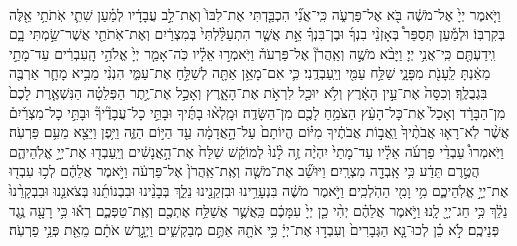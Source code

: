 \documentclass[twoside, openany, parskip=half, 11pt]{book}
\begin{document}
\begin{footnotesize}
\begin{multicols}{2}
\\
 וַיֹּ֤אמֶר יְיָ֙ אֶל־מֹשֶׁ֔ה בֹּ֖א אֶל־פַּרְעֹ֑ה כִּֽי־אֲנִ֞י הִכְבַּ֤דְתִּי אֶת־לִבּוֹ֙ וְאֶת־לֵ֣ב עֲבָדָ֔יו לְמַ֗עַן שִׁתִ֛י אֹֽתֹתַ֥י אֵ֖לֶּה בְּקִרְבּֽוֹ׃ וּלְמַ֡עַן תְּסַפֵּר֩ בְּאָזְנֵ֨י בִנְךָ֜ וּבֶן־בִּנְךָ֗ אֵ֣ת אֲשֶׁ֤ר הִתְעַלַּ֨לְתִּי֙ בְּמִצְרַ֔יִם וְאֶת־אֹֽתֹתַ֖י אֲשֶׁר־שַׂ֣מְתִּי בָ֑ם וִֽידַעְתֶּ֖ם כִּֽי־אֲנִ֥י יְיָ׃ וַיָּבֹ֨א מֹשֶׁ֣ה וְאַֽהֲרֹן֘ אֶל־פַּרְעֹה֒ וַיֹּֽאמְר֣וּ אֵלָ֗יו כֹּֽה־אָמַ֤ר יְיָ֙ אֱלֹהֵ֣י הָֽעִבְרִ֔ים עַד־מָתַ֣י מֵאַ֔נְתָּ לֵֽעָנֹ֖ת מִפָּנָ֑י שַׁלַּ֥ח עַמִּ֖י וְיַֽעַבְדֻֽנִי׃  כִּ֛י אִם־מָאֵ֥ן אַתָּ֖ה לְשַׁלֵּ֣חַ אֶת־עַמִּ֑י הִנְנִ֨י מֵבִ֥יא מָחָ֛ר אַרְבֶּ֖ה בִּגְבֻלֶֽךָ׃ וְכִסָּה֙ אֶת־עֵ֣ין הָאָ֔רֶץ וְלֹ֥א יוּכַ֖ל לִרְאֹ֣ת אֶת־הָאָ֑רֶץ וְאָכַ֣ל אֶת־יֶ֣תֶר הַפְּלֵטָ֗ה הַנִּשְׁאֶ֤רֶת לָכֶם֙ מִן־הַבָּרָ֔ד וְאָכַל֙ אֶת־כָּל־הָעֵ֔ץ הַצֹּמֵ֥חַ לָכֶ֖ם מִן־הַשָּׂדֶֽה׃ וּמָֽלְא֨וּ בָתֶּ֜יךָ וּבָתֵּ֣י כָל־עֲבָדֶ֘יךָ֘ וּבָתֵּ֣י כָל־מִצְרַ֒יִם֒ אֲשֶׁ֨ר לֹֽא־רָא֤וּ אֲבֹתֶ֨יךָ֙ וַֽאֲב֣וֹת אֲבֹתֶ֔יךָ מִיּ֗וֹם הֱיוֹתָם֙ עַל־הָ֣אֲדָמָ֔ה עַ֖ד הַיּ֣וֹם הַזֶּ֑ה וַיִּ֥פֶן וַיֵּצֵ֖א מֵעִ֥ם פַּרְעֹֽה׃  וַיֹּֽאמְרוּ֩ עַבְדֵ֨י פַרְעֹ֜ה אֵלָ֗יו עַד־מָתַי֙ יִהְיֶ֨ה זֶ֥ה לָ֨נוּ֙ לְמוֹקֵ֔שׁ שַׁלַּח֙ אֶת־הָ֣אֲנָשִׁ֔ים וְיַֽעַבְד֖וּ אֶת־יְיָ֣ אֱלֹֽהֵיהֶ֑ם הֲטֶ֣רֶם תֵּדַ֔ע כִּ֥י אָֽבְדָ֖ה מִצְרָֽיִם׃ וַיּוּשַׁ֞ב אֶת־מֹשֶׁ֤ה וְאֶֽת־אַֽהֲרֹן֙ אֶל־פַּרְעֹ֔ה וַיֹּ֣אמֶר אֲלֵהֶ֔ם לְכ֥וּ עִבְד֖וּ אֶת־יְיָ֣ אֱלֹֽהֵיכֶ֑ם מִ֥י וָמִ֖י הַהֹֽלְכִֽים׃ וַיֹּ֣אמֶר מֹשֶׁ֔ה בִּנְעָרֵ֥ינוּ וּבִזְקֵנֵ֖ינוּ נֵלֵ֑ךְ בְּבָנֵ֨ינוּ וּבִבְנוֹתֵ֜נוּ בְּצֹאנֵ֤נוּ וּבִבְקָרֵ֨נוּ֙ נֵלֵ֔ךְ כִּ֥י חַג־יְיָ֖ לָֽנוּ׃ וַיֹּ֣אמֶר אֲלֵהֶ֗ם יְהִ֨י כֵ֤ן יְיָ֙ עִמָּכֶ֔ם כַּֽאֲשֶׁ֛ר אֲשַׁלַּ֥ח אֶתְכֶ֖ם וְאֶֽת־טַפְּכֶ֑ם רְא֕וּ כִּ֥י רָעָ֖ה נֶ֥גֶד פְּנֵיכֶֽם׃ לֹ֣א כֵ֗ן לְכוּ־נָ֤א הַגְּבָרִים֙ וְעִבְד֣וּ אֶת־יְיָ֔ כִּ֥י אֹתָ֖הּ אַתֶּ֣ם מְבַקְשִׁ֑ים וַיְגָ֣רֶשׁ אֹתָ֔ם מֵאֵ֖ת פְּנֵ֥י פַרְעֹֽה׃



\end{multicols}
\end{footnotesize}
\end{document}
